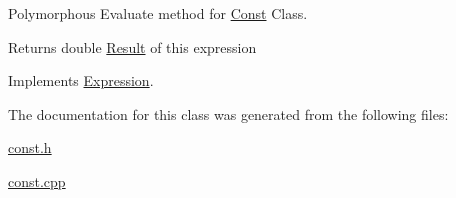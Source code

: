 Polymorphous Evaluate method for \hyperlink{class_const}{Const} Class. 

\begin{DoxyReturn}{Returns}
double \hyperlink{class_result}{Result} of this expression 
\end{DoxyReturn}


Implements \hyperlink{class_expression_a7437adfabeaeb0500d62d10c43a1f853}{Expression}.



The documentation for this class was generated from the following files\+:\begin{DoxyCompactItemize}
\item 
\hyperlink{const_8h}{const.\+h}\item 
\hyperlink{const_8cpp}{const.\+cpp}\end{DoxyCompactItemize}
